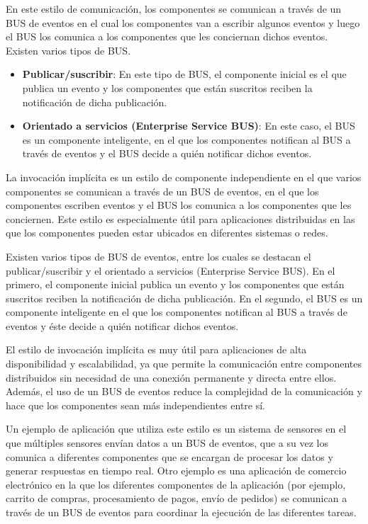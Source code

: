 \documentclass[executivepaper]{article}
\begin{document}
En este estilo de comunicación, los componentes se comunican a través de un BUS de eventos en el cual los componentes van a escribir algunos eventos y luego el BUS los comunica a los componentes que les conciernan dichos eventos. Existen varios tipos de BUS.

\begin{itemize}
\item \textbf{Publicar/suscribir}: En este tipo de BUS, el componente inicial es el que publica un evento y los componentes que están suscritos reciben la notificación de dicha publicación.
\item \textbf{Orientado a servicios (Enterprise Service BUS)}: En este caso, el BUS es un componente inteligente, en el que los componentes notifican al BUS a través de eventos y el BUS decide a quién notificar dichos eventos.
\end{itemize}

La invocación implícita es un estilo de componente independiente en el que varios componentes se comunican a través de un BUS de eventos, en el que los componentes escriben eventos y el BUS los comunica a los componentes que les conciernen. Este estilo es especialmente útil para aplicaciones distribuidas en las que los componentes pueden estar ubicados en diferentes sistemas o redes.

Existen varios tipos de BUS de eventos, entre los cuales se destacan el publicar/suscribir y el orientado a servicios (Enterprise Service BUS). En el primero, el componente inicial publica un evento y los componentes que están suscritos reciben la notificación de dicha publicación. En el segundo, el BUS es un componente inteligente en el que los componentes notifican al BUS a través de eventos y éste decide a quién notificar dichos eventos.

El estilo de invocación implícita es muy útil para aplicaciones de alta disponibilidad y escalabilidad, ya que permite la comunicación entre componentes distribuidos sin necesidad de una conexión permanente y directa entre ellos. Además, el uso de un BUS de eventos reduce la complejidad de la comunicación y hace que los componentes sean más independientes entre sí.

Un ejemplo de aplicación que utiliza este estilo es un sistema de sensores en el que múltiples sensores envían datos a un BUS de eventos, que a su vez los comunica a diferentes componentes que se encargan de procesar los datos y generar respuestas en tiempo real. Otro ejemplo es una aplicación de comercio electrónico en la que los diferentes componentes de la aplicación (por ejemplo, carrito de compras, procesamiento de pagos, envío de pedidos) se comunican a través de un BUS de eventos para coordinar la ejecución de las diferentes tareas.
\end{document}
